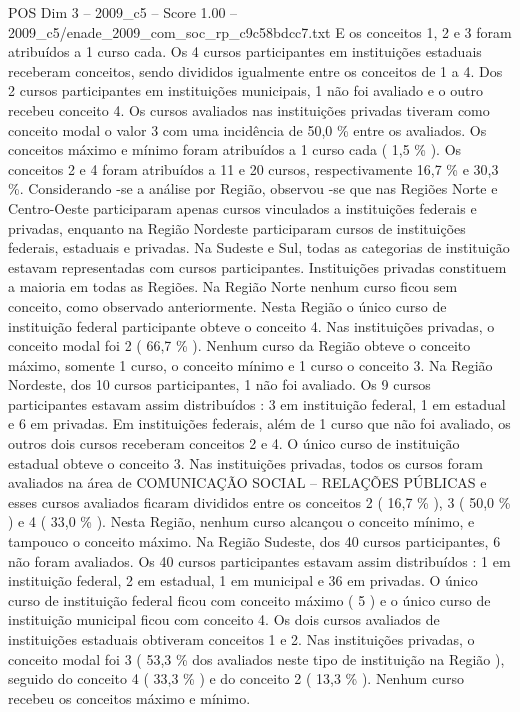 \begin{textsample}{POS Dim 3 – 2009\_c5 – Score 1.00 – 2009\_c5/enade\_2009\_com\_soc\_rp\_c9c58bdcc7.txt}
E os conceitos 1, 2 e 3 foram atribuídos a 1 curso cada.
Os 4 cursos participantes em instituições estaduais receberam conceitos, sendo divididos igualmente entre os conceitos de 1 a 4.
Dos 2 cursos participantes em instituições municipais, 1 não foi avaliado e o outro recebeu conceito 4.
Os cursos avaliados nas instituições privadas tiveram como conceito modal o valor 3 com uma incidência de 50,0 \% entre os avaliados.
Os conceitos máximo e mínimo foram atribuídos a 1 curso cada ( 1,5 \% ).
Os conceitos 2 e 4 foram atribuídos a 11 e 20 cursos, respectivamente 16,7 \% e 30,3 \%.
Considerando -se a análise por Região, observou -se que nas Regiões Norte e Centro-Oeste participaram apenas cursos vinculados a instituições federais e privadas, enquanto na Região Nordeste participaram cursos de instituições federais, estaduais e privadas.
Na Sudeste e Sul, todas as categorias de instituição estavam representadas com cursos participantes.
Instituições privadas constituem a maioria em todas as Regiões.
Na Região Norte nenhum curso ficou sem conceito, como observado anteriormente.
Nesta Região o único curso de instituição federal participante obteve o conceito 4.
Nas instituições privadas, o conceito modal foi 2 ( 66,7 \% ).
Nenhum curso da Região obteve o conceito máximo, somente 1 curso, o conceito mínimo e 1 curso o conceito 3.
Na Região Nordeste, dos 10 cursos participantes, 1 não foi avaliado.
Os 9 cursos participantes estavam assim distribuídos : 3 em instituição federal, 1 em estadual e 6 em privadas.
Em instituições federais, além de 1 curso que não foi avaliado, os outros dois cursos receberam conceitos 2 e 4.
O único curso de instituição estadual obteve o conceito 3.
Nas instituições privadas, todos os cursos foram avaliados na área de COMUNICAÇÃO SOCIAL – RELAÇÕES PÚBLICAS e esses cursos avaliados ficaram divididos entre os conceitos 2 ( 16,7 \% ), 3 ( 50,0 \% ) e 4 ( 33,0 \% ).
Nesta Região, nenhum curso alcançou o conceito mínimo, e tampouco o conceito máximo.
Na Região Sudeste, dos 40 cursos participantes, 6 não foram avaliados.
Os 40 cursos participantes estavam assim distribuídos : 1 em instituição federal, 2 em estadual, 1 em municipal e 36 em privadas.
O único curso de instituição federal ficou com conceito máximo ( 5 ) e o único curso de instituição municipal ficou com conceito 4.
Os dois cursos avaliados de instituições estaduais obtiveram conceitos 1 e 2.
Nas instituições privadas, o conceito modal foi 3 ( 53,3 \% dos avaliados neste tipo de instituição na Região ), seguido do conceito 4 ( 33,3 \% ) e do conceito 2 ( 13,3 \% ).
Nenhum curso recebeu os conceitos máximo e mínimo.

\end{textsample}
